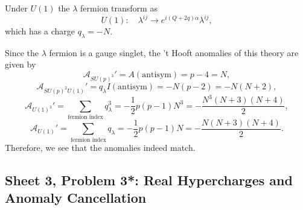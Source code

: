 \begin{solution}
    Under $U(1)$ the $\lambda$ fermion transform as
    \begin{equation}
        U(1):\quad \lambda^{ij} \to e^{i(Q+2q)\alpha}\lambda^{ij},
    \end{equation}
    which has a charge $q_\lambda = -N$.

    Since the $\lambda$ fermion is a gauge singlet, the 't Hooft anomalies of this theory are given by
    \begin{equation}
        \mathcal{A}_{SU(p)^3}' =  A(\mathrm{antisym}) = p-4 = N,
    \end{equation}
    \begin{equation}
        \mathcal{A}_{SU(p)^2U(1)}' = q_\lambda I(\mathrm{antisym}) = -N(p-2) = -N(N+2),
    \end{equation}
    \begin{equation}
        \mathcal{A}_{U(1)^3}' =  \sum_{\text{fermion index}} q_\lambda^3 = -\frac{1}{2}p(p-1)N^3 = -\frac{N^3(N+3)(N+4)}{2},
    \end{equation}
    \begin{equation}
        \mathcal{A}_{U(1)}' = \sum_{\text{fermion index}} q_\lambda = -\frac{1}{2}p(p-1)N =  -\frac{N(N+3)(N+4)}{2}.
    \end{equation}
    Therefore, we see that the anomalies indeed match.
\end{solution}

\subsection{Sheet 3, Problem 3*: Real Hypercharges and Anomaly Cancellation}

